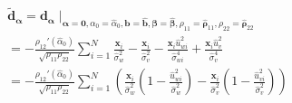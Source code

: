 \documentclass[aap,authoryear, preprint]{imsart}
\numberwithin{equation}{section}
\theoremstyle{plain}
\begin{document}
\begin{equation}
    \begin{multlined}
    \bm{\tilde{d}}_{\bm{\alpha}} = \bm{d}_{\bm{\alpha}}\mid_{\bm{\alpha}=\bm{0}, \alpha_0 = \hat{\alpha}_0, \bm{b} = \bm{\hat{b}},\bm{\beta} = \bm{\hat{\beta}}, {\rho}_{11} = {\bm{\hat{\rho}}_{11}},
    {\rho}_{22} = {\bm{\hat{\rho}}_{22}}}\\
    = -\frac{\rho_{12}'(\hat{\alpha}_0)}{\sqrt{\rho_{11}\rho_{22}}} \sum_{i=1}^{N} \frac{\bm{x}_i}{\hat{\sigma}_{w}^2} - \frac{\bm{x}_i}{\hat{\sigma}_{v}^2} - \frac{\bm{x}_i \hat{u}_{wi}^2}{\hat{\sigma}_{wi}^4} + \frac{\bm{x}_i \hat{u}_{v}^2}{\hat{\sigma}_{v}^4}\\
    = -\frac{\rho_{12}'(\hat{\alpha}_0)}{\sqrt{\rho_{11}\rho_{22}}} \sum_{i=1}^{N} \left(
    \frac{\bm{x}_i}{\hat{\sigma}_{w}^2}
    \left( 1-\frac{\hat{u}_{wi}^2}{\hat{\sigma}_{w}^2}\right) - 
    \frac{\bm{x}_i}{\hat{\sigma}_{v}^2}
    \left( 1-\frac{\hat{u}_{vi}^2}{\hat{\sigma}_{v}^2}\right) 
    \right)
    \end{multlined}
\end{equation}

\end{document}
